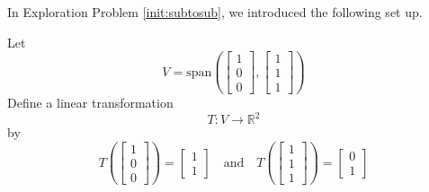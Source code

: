 \documentclass{ximera}
\newcommand{\RR}{\mathbb{R}}
\begin{document}
\begin{example}\label{ex:inversematrixoftransform}
In Exploration Problem \ref{init:subtosub}, we introduced the following set up.

Let $$V=\text{span}\left(\begin{bmatrix}1\\0\\0\end{bmatrix}, \begin{bmatrix}1\\1\\1\end{bmatrix}\right)$$
Define a linear transformation $$T:V\rightarrow \RR^2$$
by $$T\left(\begin{bmatrix}1\\0\\0\end{bmatrix}\right)=\begin{bmatrix}1\\1\end{bmatrix}\quad \text{and} \quad T\left(\begin{bmatrix}1\\1\\1\end{bmatrix}\right)=\begin{bmatrix}0\\1\end{bmatrix}$$


\end{example}
\end{document}
